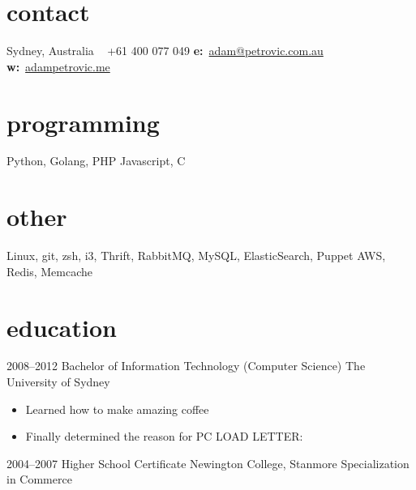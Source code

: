 \documentclass[]{friggeri-cv} %
\begin{document}


\begin{aside} %
\section{contact}
Sydney, Australia
~
+61 400 077 049
\textbf{e:}~\href{mailto:adam@petrovic.com.au}{adam@petrovic.com.au}
\textbf{w:}~\href{http://www.adampetrovic.me}{adampetrovic.me}
\section{programming}
Python, Golang, PHP
Javascript, C
\section{other}
Linux, git, zsh, i3, Thrift, RabbitMQ, MySQL, ElasticSearch, Puppet AWS, Redis, Memcache
\end{aside}


\section{education}

\begin{entrylist}
\entry
{2008--2012}
{Bachelor {\normalfont of Information Technology (Computer Science)}}
{The University of Sydney}
{   \begin{itemize}
    \item Learned how to make amazing coffee
    \item Finally determined the reason for \textsc{PC LOAD LETTER}:
    \end{itemize} }
\entry
{2004--2007}
{Higher School Certificate}
{Newington College, Stanmore}
{Specialization in Commerce}
\end{entrylist}
\end{document}
